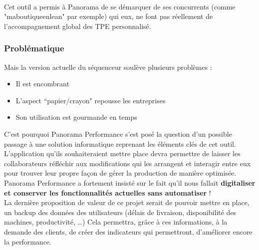 \hfill \\
Cet outil a permis à Panorama de se démarquer de ses concurrents (comme "maboutiqueenlean"\cite{MaBoutiqueEnLean} par exemple) qui eux, ne font pas réellement de l'accompagnement global des TPE personnalisé.


\clearpage
\subsubsection*{Problématique}
Mais la version actuelle du séquenceur soulève plusieurs problèmes : 
\begin{itemize}
    \item Il est encombrant
    \item L'aspect “papier/crayon" repousse les entreprises
    \item Son utilisation est gourmande en temps
\end{itemize}

C'est pourquoi Panorama Performance s'est posé la question d'un possible passage à une solution informatique reprenant les éléments clés de cet outil. L'application qu'ils souhaiteraient mettre place devra permettre de laisser les collaborateurs réfléchir aux modifications qui les arrangent et interagir entre eux pour trouver leur propre façon de gérer la production de manière optimisée. Panorama Performance a fortement insisté sur le fait qu'il nous fallait \textbf{digitaliser et conserver les fonctionnalités actuelles sans automatiser} !\\

La dernière proposition de valeur de ce projet serait de pouvoir mettre en place, un backup des données des utilisateurs (délais de livraison, disponibilité des machines, productivité, \dots) Cela permettra, grâce à ces informations, à la demande des clients, de créer des indicateurs qui permettront, d'améliorer encore la performance.

